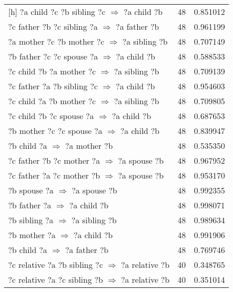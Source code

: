 \begin{longtable}{lrr}[h]
       ?a  child  ?c  ?b  sibling  ?c   $\Rightarrow$ ?a  child  ?b &           48 &        0.851012 \\
     ?c  father  ?b  ?c  sibling  ?a   $\Rightarrow$ ?a  father  ?b &           48 &        0.961199 \\
     ?a  mother  ?c  ?b  mother  ?c   $\Rightarrow$ ?a  sibling  ?b &           48 &        0.707149 \\
       ?b  father  ?c  ?c  spouse  ?a   $\Rightarrow$ ?a  child  ?b &           48 &        0.588533 \\
      ?c  child  ?b  ?a  mother  ?c   $\Rightarrow$ ?a  sibling  ?b &           48 &        0.709139 \\
      ?c  father  ?a  ?b  sibling  ?c   $\Rightarrow$ ?a  child  ?b &           48 &        0.954603 \\
      ?c  child  ?a  ?b  mother  ?c   $\Rightarrow$ ?a  sibling  ?b &           48 &        0.709805 \\
        ?c  child  ?b  ?c  spouse  ?a   $\Rightarrow$ ?a  child  ?b &           48 &        0.687653 \\
       ?b  mother  ?c  ?c  spouse  ?a   $\Rightarrow$ ?a  child  ?b &           48 &        0.839947 \\
                       ?b  child  ?a   $\Rightarrow$ ?a  mother  ?b &           48 &        0.535350 \\
      ?c  father  ?b  ?c  mother  ?a   $\Rightarrow$ ?a  spouse  ?b &           48 &        0.967952 \\
      ?c  father  ?a  ?c  mother  ?b   $\Rightarrow$ ?a  spouse  ?b &           48 &        0.953170 \\
                      ?b  spouse  ?a   $\Rightarrow$ ?a  spouse  ?b &           48 &        0.992355 \\
                       ?b  father  ?a   $\Rightarrow$ ?a  child  ?b &           48 &        0.998071 \\
                    ?b  sibling  ?a   $\Rightarrow$ ?a  sibling  ?b &           48 &        0.989634 \\
                       ?b  mother  ?a   $\Rightarrow$ ?a  child  ?b &           48 &        0.991906 \\
                       ?b  child  ?a   $\Rightarrow$ ?a  father  ?b &           48 &        0.769746 \\
 ?c  relative  ?a  ?b  sibling  ?c   $\Rightarrow$ ?a  relative  ?b &           40 &        0.348765 \\
 ?c  relative  ?a  ?c  sibling  ?b   $\Rightarrow$ ?a  relative  ?b &           40 &        0.351014 \\

\end{longtable}
